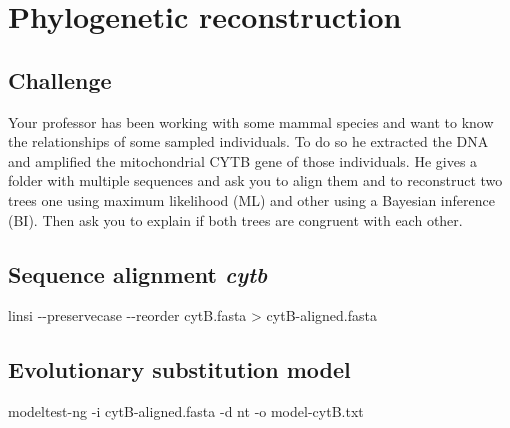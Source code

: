 \documentclass[
  letterpaper,
]{scrbook}
\newenvironment{Shaded}{\begin{snugshade}}{\end{snugshade}}
\newcommand{\AttributeTok}[1]{\textcolor[rgb]{0.40,0.46,0.14}{#1}}
\newcommand{\ExtensionTok}[1]{\textcolor[rgb]{0.00,0.46,0.62}{#1}}
\newcommand{\NormalTok}[1]{\textcolor[rgb]{0.00,0.46,0.62}{#1}}
\newcommand{\OperatorTok}[1]{\textcolor[rgb]{0.37,0.37,0.37}{#1}}
\begin{document}
\hypertarget{phylogenetic-reconstruction}{%
\chapter{Phylogenetic
reconstruction}\label{phylogenetic-reconstruction}}

\hypertarget{challenge-3}{%
\section*{Challenge}\label{challenge-3}}

Your professor has been working with some mammal species and want to
know the relationships of some sampled individuals. To do so he
extracted the DNA and amplified the mitochondrial CYTB gene of those
individuals. He gives a folder with multiple sequences and ask you to
align them and to reconstruct two trees one using maximum likelihood
(ML) and other using a Bayesian inference (BI). Then ask you to explain
if both trees are congruent with each other.

\hypertarget{sequence-alignment-cytb}{%
\section*{\texorpdfstring{Sequence alignment
\emph{cytb}}{Sequence alignment cytb}}\label{sequence-alignment-cytb}}

\begin{Shaded}
\begin{Highlighting}[]
\ExtensionTok{linsi} \AttributeTok{{-}{-}preservecase} \AttributeTok{{-}{-}reorder}\NormalTok{ cytB.fasta }\OperatorTok{\textgreater{}}\NormalTok{ cytB{-}aligned.fasta}
\end{Highlighting}
\end{Shaded}

\hypertarget{evolutionary-substitution-model}{%
\section*{Evolutionary substitution
model}\label{evolutionary-substitution-model}}

\begin{Shaded}
\begin{Highlighting}[]
\ExtensionTok{modeltest{-}ng} \AttributeTok{{-}i}\NormalTok{ cytB{-}aligned.fasta }\AttributeTok{{-}d}\NormalTok{ nt }\AttributeTok{{-}o}\NormalTok{ model{-}cytB.txt}
\end{Highlighting}
\end{Shaded}
\end{document}
